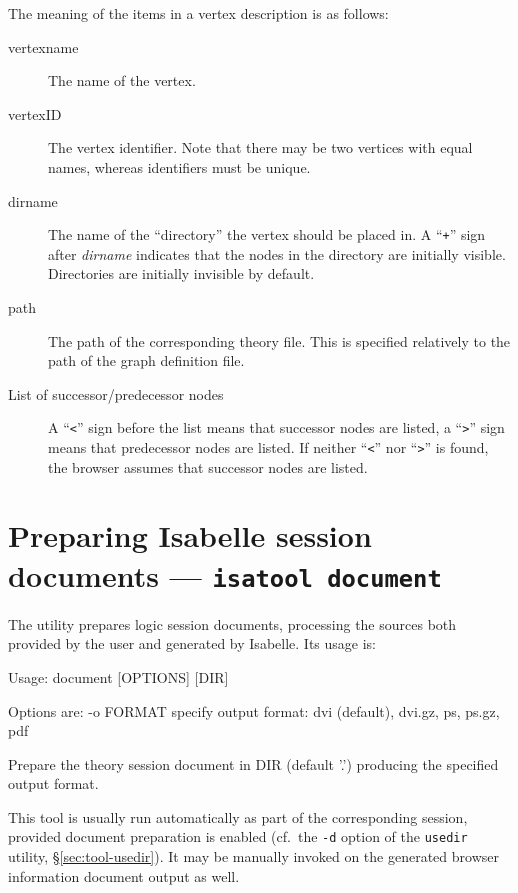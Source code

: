 The meaning of the items in a vertex description is as follows:
\begin{description}
  
\item[vertexname] The name of the vertex.
  
\item[vertexID] The vertex identifier. Note that there may be two
  vertices with equal names, whereas identifiers must be unique.
  
\item[dirname] The name of the ``directory'' the vertex should be
  placed in.  A ``{\tt +}'' sign after {\it dirname} indicates that
  the nodes in the directory are initially visible. Directories are
  initially invisible by default.
  
\item[path] The path of the corresponding theory file. This is
  specified relatively to the path of the graph definition file.
  
\item[List of successor/predecessor nodes] A ``{\tt <}'' sign before
  the list means that successor nodes are listed, a ``{\tt >}'' sign
  means that predecessor nodes are listed. If neither ``{\tt <}'' nor
  ``{\tt >}'' is found, the browser assumes that successor nodes are
  listed.

\end{description}


\section{Preparing Isabelle session documents --- \texttt{isatool document}}
\label{sec:tool-document}

The  utility prepares logic session documents, processing the
sources both provided by the user and generated by Isabelle.  Its usage is:
\begin{ttbox}
Usage: document [OPTIONS] [DIR]

  Options are:
    -o FORMAT    specify output format: dvi (default), dvi.gz, ps,
                 ps.gz, pdf

  Prepare the theory session document in DIR (default '.')
  producing the specified output format.
\end{ttbox}
This tool is usually run automatically as part of the corresponding session,
provided document preparation is enabled (cf.\ the \texttt{-d} option of the
\texttt{usedir} utility, \S\ref{sec:tool-usedir}).  It may be manually invoked
on the generated browser information document output as well.


